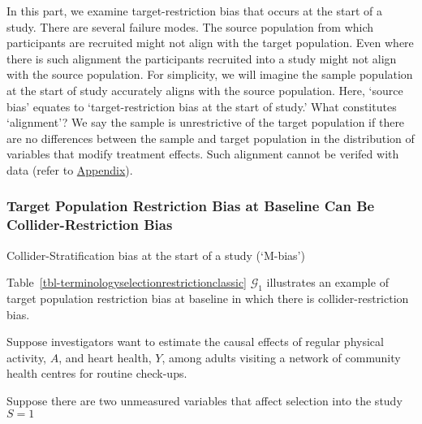 \documentclass[
  single column]{article}
\begin{document}
In this part, we examine target-restriction bias that occurs at the
start of a study. There are several failure modes. The source population
from which participants are recruited might not align with the target
population. Even where there is such alignment the participants
recruited into a study might not align with the source population. For
simplicity, we will imagine the sample population at the start of study
accurately aligns with the source population. Here, `source bias'
equates to `target-restriction bias at the start of study.' What
constitutes `alignment'? We say the sample is unrestrictive of the
target population if there are no differences between the sample and
target population in the distribution of variables that modify treatment
effects. Such alignment cannot be verifed with data (refer to
\hyperref[id-app-c]{Appendix}).

\subsubsection{Target Population Restriction Bias at Baseline Can Be
Collider-Restriction
Bias}\label{target-population-restriction-bias-at-baseline-can-be-collider-restriction-bias}

\begin{table}

\caption{\label{tbl-terminologyselectionrestrictionclassic}Collider-Stratification
bias at the start of a study (`M-bias')}

\centering{

\terminologyselectionrestrictionclassic

}

\end{table}%

Table~\ref{tbl-terminologyselectionrestrictionclassic} \(\mathcal{G}_1\)
illustrates an example of target population restriction bias at baseline
in which there is collider-restriction bias.

Suppose investigators want to estimate the causal effects of regular
physical activity, \(A\), and heart health, \(Y\), among adults visiting
a network of community health centres for routine check-ups.

Suppose there are two unmeasured variables that affect selection into
the study \(S=1\)
\end{document}
